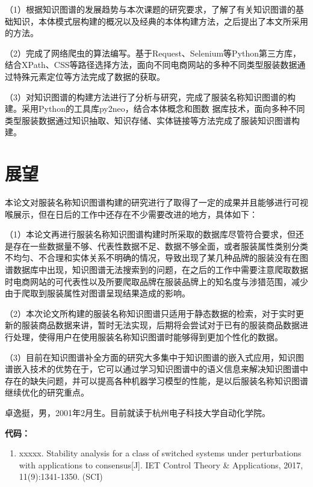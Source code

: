 \documentclass[bachelor_p]{hdu-thesis}
\begin{document}
（1）根据知识图谱的发展趋势与本次课题的研究要求，了解了有关知识图谱的基础知识，本体模式层构建的概况以及经典的本体构建方法，之后提出了本文所采用的方法。

（2）完成了网络爬虫的算法编写。基于Request、Selenium等Python第三方库，结合XPath、CSS等路径选择方法，面向不同电商网站的多种不同类型服装数据通过特殊元素定位等方法完成了数据的获取。

（3）对知识图谱的构建方法进行了分析与研究，完成了服装名称知识图谱的构建。采用Python的工具库py2neo，结合本体概念和图数
据库技术，面向多种不同类型服装数据通过知识抽取、知识存储、实体链接等方法完成了服装知识图谱构建。
\section{展望}
本论文对服装名称知识图谱构建的研究进行了取得了一定的成果并且能够进行可视喉展示，但在日后的工作中还存在不少需要改进的地方，具体如下：

（1）本论文再进行服装名称知识图谱构建时所采取的数据库尽管符合要求，但还是存在一些数据量不够、代表性数据不足、数据不够全面，或者服装属性类别分类不均匀、不合理和实体关系不明确的情况，导致出现了某几种品牌的服装没有在图谱数据库中出现，知识图谱无法搜索到的问题，在之后的工作中需要注意爬取数据时电商网站的可代表性以及所要爬取品牌在服装品牌上的知名度与涉猎范围，减少由于爬取到服装属性对图谱呈现结果造成的影响。

（2）本次论文所构建的服装名称知识图谱只适用于静态数据的检索，对于实时更新的服装商品数据来讲，暂时无法实现，后期将会尝试对于已有的服装商品数据进行处理，使得用户在使用服装名称知识图谱时能够得到更加个性化的数据。

（3）目前在知识图谱补全方面的研究大多集中于知识图谱的嵌入式应用，知识图谱嵌入技术的优势在于，它可以通过学习知识图谱中的语义信息来解决知识图谱中存在的缺失问题，并可以提高各种机器学习模型的性能，是以后服装名称知识图谱继续优化的研究重点。







%
%



\hduappendix
卓逸挺，男，2001年2月生。目前就读于杭州电子科技大学自动化学院。\\

{\par\bfseries \noindent 代码：}
\begin{enumerate}
  \item  xxxxx. \newblock Stability analysis for a class of switched systems under
        perturbations with applications to consensus[J].
        \newblock IET Control Theory \& Applications, 2017, 11(9):1341-1350. (SCI)
\end{enumerate}

\end{document}
